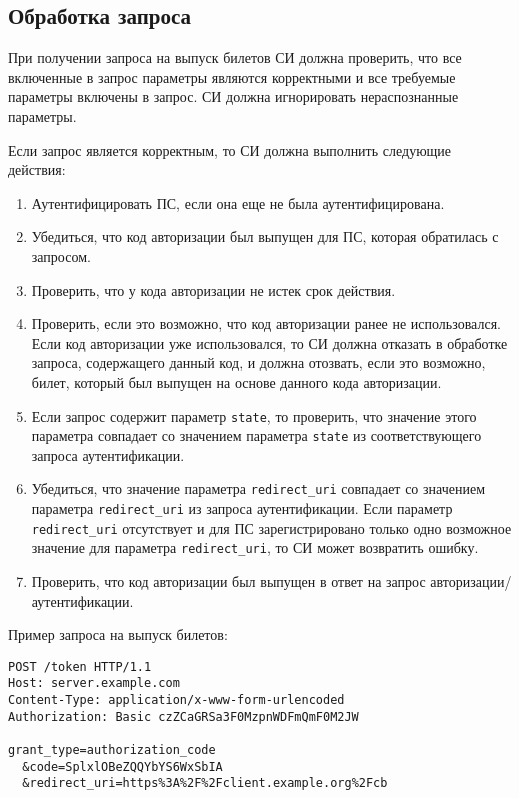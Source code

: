 \label{REQRESP.Token}

\subsection{Обработка запроса}\label{REQRESP.Token.Req}

При получении запроса на выпуск билетов СИ должна проверить, что все включенные в
запрос параметры являются корректными и все требуемые параметры включены в
запрос.
%
СИ должна игнорировать нераспознанные параметры.

Если запрос является корректным, то СИ должна выполнить следующие действия:
\begin{enumerate}
\item 
Аутентифицировать ПС, если она еще не была аутентифицирована.

\item 
Убедиться, что код авторизации был выпущен для ПС, которая обратилась с запросом.

\item
Проверить, что у кода авторизации не истек срок действия.

\item
Проверить, если это возможно, что код авторизации ранее не использовался. Если
код авторизации уже использовался, то СИ должна отказать в обработке запроса,
содержащего данный код, и должна отозвать, если это возможно, билет, который был
выпущен на основе данного кода авторизации.

\item
Если запрос содержит параметр \lstinline{state}, то проверить, что значение
этого параметра совпадает со значением параметра \lstinline{state} из
соответствующего запроса аутентификации.

\item
Убедиться, что значение параметра \lstinline{redirect_uri} совпадает со
значением параметра \lstinline{redirect_uri} из запроса аутентификации. Если
параметр \lstinline{redirect_uri} отсутствует и для ПС зарегистрировано только
одно возможное значение для параметра \lstinline{redirect_uri}, то СИ может
возвратить ошибку.

\item  
Проверить, что код авторизации был выпущен в ответ на запрос 
авторизации/аутентификации.
\end{enumerate}

Пример запроса на выпуск билетов:
\begin{lstlisting}
POST /token HTTP/1.1
Host: server.example.com
Content-Type: application/x-www-form-urlencoded
Authorization: Basic czZCaGRSa3F0MzpnWDFmQmF0M2JW

grant_type=authorization_code
  &code=SplxlOBeZQQYbYS6WxSbIA
  &redirect_uri=https%3A%2F%2Fclient.example.org%2Fcb
\end{lstlisting}

